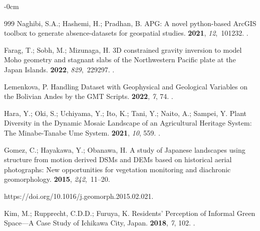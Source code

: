 \documentclass[land,article,accept,pdftex,moreauthors]{Definitions/mdpi}
\begin{document}
\begin{adjustwidth}{-\extralength}{0cm}
\begin{thebibliography}{999}
Naghibi, S.A.; Hashemi, H.; Pradhan, B.
\newblock APG: A novel python-based ArcGIS toolbox to generate absence-datasets
  for geospatial studies.
 {\bf 2021}, {\em 12},~101232.
.

Farag, T.; Sobh, M.; Mizunaga, H.
\newblock 3D constrained gravity inversion to model Moho geometry and stagnant
  slabs of the Northwestern Pacific plate at the Japan Islands.
 {\bf 2022}, {\em 829},~229297.
.

Lemenkova, P.
\newblock Handling Dataset with Geophysical and Geological Variables on the
  Bolivian Andes by the GMT Scripts.
 {\bf 2022}, {\em 7}, 74.
.

Hara, Y.; Oki, S.; Uchiyama, Y.; Ito, K.; Tani, Y.; Naito, A.; Sampei, Y.
\newblock Plant Diversity in the Dynamic Mosaic Landscape of an Agricultural
  Heritage System: The Minabe-Tanabe Ume System.
 {\bf 2021}, {\em 10}, 559.
.

Gomez, C.; Hayakawa, Y.; Obanawa, H.
\newblock A study of Japanese landscapes using structure from motion derived
  DSMs and DEMs based on historical aerial photographs: New opportunities for
  vegetation monitoring and diachronic geomorphology.
 {\bf 2015}, {\em 242},~11--20.

 {{https://doi.org/10.1016/j.geomorph.2015.02.021}}.

Kim, M.; Rupprecht, C.D.D.; Furuya, K.
\newblock Residents’ Perception of Informal Green Space---A Case Study of
  Ichikawa City, Japan.
 {\bf 2018}, {\em 7}, 102.
.


\end{thebibliography}
\end{adjustwidth}
\end{document}
